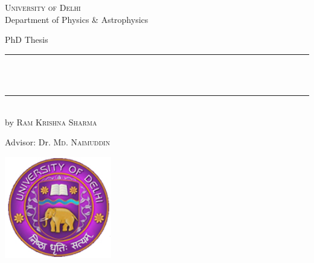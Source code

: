 \begin{titlepage}
	\begin{addmargin}[-1cm]{-3cm}
    \begin{center}
        \large
        {\Large \textsc{University of Delhi}}\\[1ex]
        Department of Physics \& Astrophysics\\

        \vfill

        PhD Thesis\\ \vskip1cm
        \rule{14cm}{0.4pt} \\ \bigskip
            {} \\ \bigskip
        \rule{14cm}{0.4pt}\\ \vskip1cm
        by \textsc{Ram Krishna Sharma}

        \vfill
        \vfill
        \vfill

        \hfill Advisor: Dr. \textsc{Md. Naimuddin}\\
    \end{center}
    \vspace{-3.5cm}\includegraphics[width=0.35\textwidth]{figures/logo_du.jpg}
  \end{addmargin}
\end{titlepage}